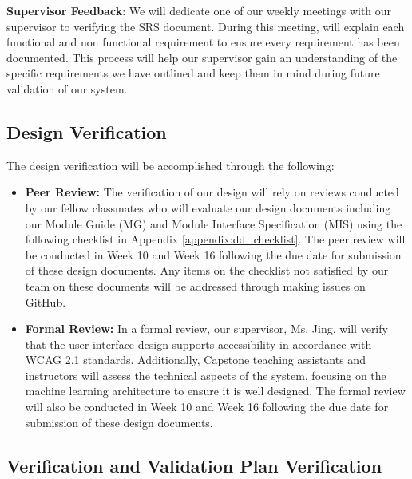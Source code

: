 \documentclass[12pt, titlepage]{article}
\begin{document}
\textbf{Supervisor Feedback}:
We will dedicate one of our weekly meetings with our supervisor to verifying the SRS document. 
During this meeting, will explain each functional and non functional requirement to ensure every requirement has been documented.
This process will help our supervisor gain an understanding of the specific requirements we have outlined and keep them in 
mind during future validation of our system. \\


\subsection{Design Verification}
The design verification will be accomplished through the following: 
\begin{itemize}
  \item \textbf{Peer Review:} The verification of our design will rely on reviews conducted by our fellow classmates who will
  evaluate our design documents including our Module Guide (MG) and Module Interface Specification (MIS) using the following checklist in Appendix \ref{appendix:dd_checklist}. The peer review will
  be conducted in Week 10 and Week 16 following the due date for submission of these design documents.
  Any items on the checklist not satisfied by our team on these documents will be addressed through making issues on GitHub.
  \item \textbf{Formal Review:} In a formal review, our supervisor, Ms. Jing, will verify that the user interface design supports accessibility in accordance with WCAG 2.1 standards. 
  Additionally, Capstone teaching assistants and instructors will assess the technical aspects of the system, focusing on the machine learning architecture to ensure it is well designed.
  The formal review will also be conducted in Week 10 and Week 16 following the due date for submission of these design documents.
\end{itemize}

\subsection{Verification and Validation Plan Verification}


\end{document}
